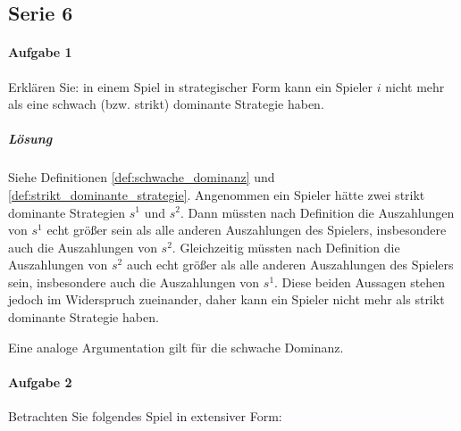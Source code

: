 \subsection{Serie 6}%
\label{sub:serie_6}

\paragraph{Aufgabe 1}%
\label{par:aufgabe_1}

Erklären Sie: in einem Spiel in strategischer Form kann ein Spieler $i$ nicht
mehr als eine schwach (bzw. strikt) dominante Strategie haben.

\subparagraph{Lösung}%

Siehe Definitionen \ref{def:schwache_dominanz} und \ref{def:strikt_dominante_strategie}.
Angenommen ein Spieler hätte zwei strikt dominante Strategien $s^1$ und $s^2$.
Dann müssten nach Definition die Auszahlungen von $s^1$ echt größer sein als alle anderen
Auszahlungen des Spielers, insbesondere auch die Auszahlungen von $s^2$.
Gleichzeitig müssten nach Definition die Auszahlungen von $s^2$ auch echt größer als alle
anderen Auszahlungen des Spielers sein, insbesondere auch die Auszahlungen von $s^1$.
Diese beiden Aussagen stehen jedoch im Widerspruch zueinander, daher kann ein Spieler
nicht mehr als strikt dominante Strategie haben.

Eine analoge Argumentation gilt für die schwache Dominanz.

\paragraph{Aufgabe 2}%
\label{par:aufgabe_2}

Betrachten Sie folgendes Spiel in extensiver Form:
\begin{center}
\end{center}

